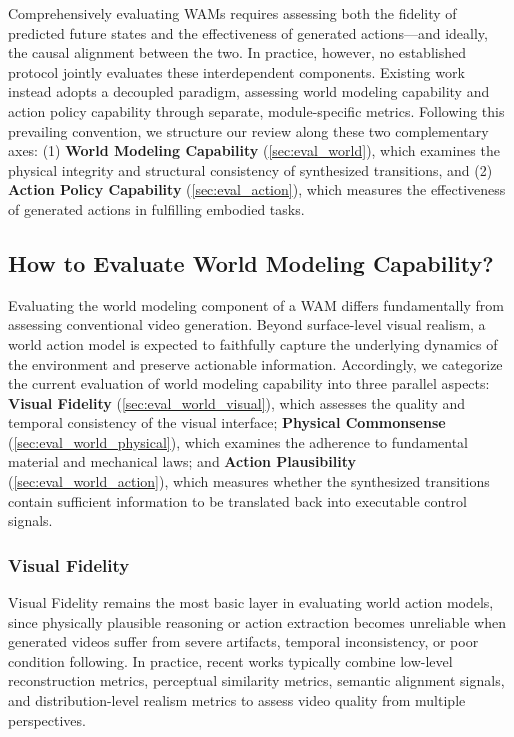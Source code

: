 \label{sec:eval}

Comprehensively evaluating WAMs requires assessing both the fidelity of predicted future states and the effectiveness of generated actions—and ideally, the causal alignment between the two. In practice, however, no established protocol jointly evaluates these interdependent components. Existing work instead adopts a decoupled paradigm, assessing world modeling capability and action policy capability through separate, module-specific metrics. Following this prevailing convention, we structure our review along these two complementary axes: (1) \textbf{World Modeling Capability} (\autoref{sec:eval_world}), which examines the physical integrity and structural consistency of synthesized transitions, and (2) \textbf{Action Policy Capability} (\autoref{sec:eval_action}), which measures the effectiveness of generated actions in fulfilling embodied tasks.



\subsection{How to Evaluate World Modeling Capability?}

\label{sec:eval_world}


Evaluating the world modeling component of a WAM differs fundamentally from assessing conventional video generation. Beyond surface-level visual realism, a world action model is expected to faithfully capture the underlying dynamics of the environment and preserve actionable information. Accordingly, we categorize the current evaluation of world modeling capability into three parallel aspects: \textbf{Visual Fidelity} (\autoref{sec:eval_world_visual}), which assesses the quality and temporal consistency of the visual interface; \textbf{Physical Commonsense} (\autoref{sec:eval_world_physical}), which examines the adherence to fundamental material and mechanical laws; and \textbf{Action Plausibility} (\autoref{sec:eval_world_action}), which measures whether the synthesized transitions contain sufficient information to be translated back into executable control signals.


\subsubsection{Visual Fidelity}
\label{sec:eval_world_visual}
Visual Fidelity remains the most basic layer in evaluating world action models, since physically plausible reasoning or action extraction becomes unreliable when generated videos suffer from severe artifacts, temporal inconsistency, or poor condition following. In practice, recent works typically combine low-level reconstruction metrics, perceptual similarity metrics, semantic alignment signals, and distribution-level realism metrics to assess video quality from multiple perspectives.

